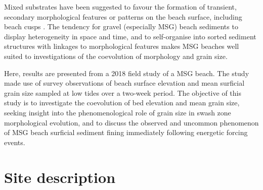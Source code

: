 \documentclass[preprint,12pt,authoryear]{elsarticle}
\begin{document}
Mixed substrates have been suggested to favour the formation of transient, secondary morphological features or patterns on the beach surface, including beach cusps \citep[e.g.,][]{LonguetHiggins_Parkin1962, Guest_Hay2019}. The tendency for gravel (especially MSG) beach sediments to display heterogeneity in space and time, and to self-organise into sorted sediment structures with linkages to morphological features \citep[e.g.,][]{Sherman_etal1993, Austin_Buscombe2008} makes MSG beaches well suited to investigations of the coevolution of morphology and grain size. 


Here, results are presented from a 2018 field study of a MSG beach. The study made use of survey observations of beach surface elevation and mean surficial grain size sampled at low tides over a two-week period. The objective of this study is to investigate the coevolution of bed elevation and mean grain size, seeking insight into the phenomenological role of grain size in swash zone morphological evolution, and to discuss the observed and uncommon phenomenon of MSG beach surficial sediment fining immediately following energetic forcing events. %


\section{Site description}\label{Site}
%
%
%
%
%

\end{document}
